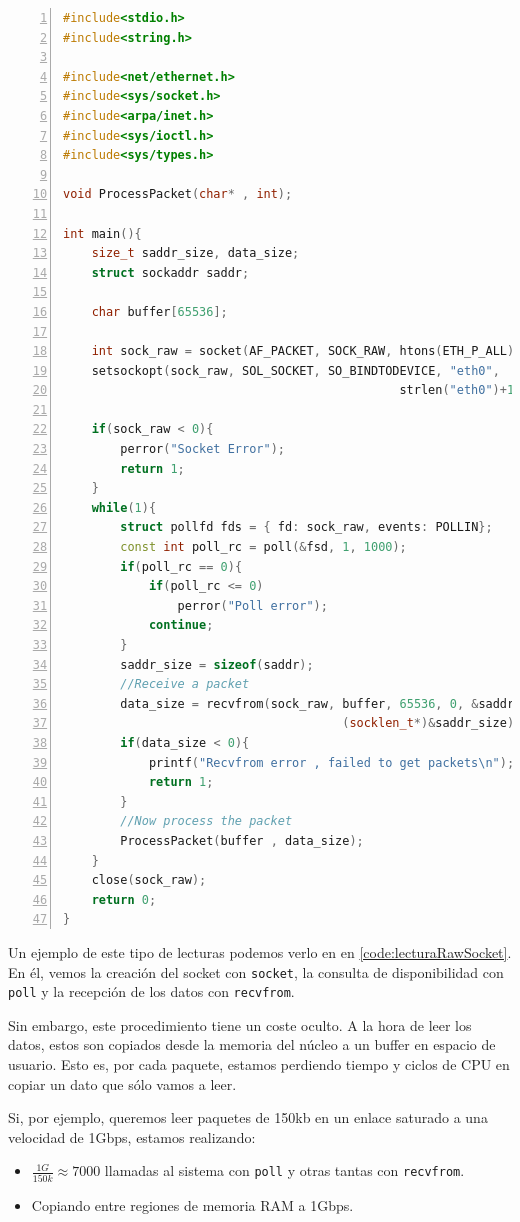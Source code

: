\begin{lstlisting}[language=C++,caption={Lectura desde un socket crudo}, 
breaklines=true, label=code:lecturaRawSocket,numbers=left,float=phtb]
#include<stdio.h>
#include<string.h>

#include<net/ethernet.h>
#include<sys/socket.h>
#include<arpa/inet.h>
#include<sys/ioctl.h>
#include<sys/types.h>
 
void ProcessPacket(char* , int);
 
int main(){
    size_t saddr_size, data_size;
    struct sockaddr saddr;
         
    char buffer[65536];
   
    int sock_raw = socket(AF_PACKET, SOCK_RAW, htons(ETH_P_ALL));
    setsockopt(sock_raw, SOL_SOCKET, SO_BINDTODEVICE, "eth0", 
                                               strlen("eth0")+1);
     
    if(sock_raw < 0){
        perror("Socket Error");
        return 1;
    }
    while(1){
        struct pollfd fds = { fd: sock_raw, events: POLLIN};
        const int poll_rc = poll(&fsd, 1, 1000);
        if(poll_rc == 0){
            if(poll_rc <= 0)
                perror("Poll error");
            continue;
        }
        saddr_size = sizeof(saddr);
        //Receive a packet
        data_size = recvfrom(sock_raw, buffer, 65536, 0, &saddr, 
                                       (socklen_t*)&saddr_size);
        if(data_size < 0){
            printf("Recvfrom error , failed to get packets\n");
            return 1;
        }
        //Now process the packet
        ProcessPacket(buffer , data_size);
    }
    close(sock_raw);
    return 0;
}
\end{lstlisting}

Un ejemplo de este tipo de lecturas podemos verlo en en \lstlistingname{} \ref{code:lecturaRawSocket}. En él, vemos la 
creación del socket con \texttt{socket}, la consulta de disponibilidad con \texttt{poll} y la recepción de los datos 
con \texttt{recvfrom}.

Sin embargo, este procedimiento tiene un coste oculto. A la hora de leer los datos, estos son copiados desde la 
memoria del núcleo a un buffer en espacio de usuario. Esto es, por cada paquete, estamos perdiendo tiempo y ciclos de 
CPU en copiar un dato que sólo vamos a leer.

Si, por ejemplo, queremos leer paquetes de 150kb en un enlace saturado a una velocidad de 1Gbps, estamos realizando:
\begin{itemize}
 \item $\frac{1G}{150k} \approx 7000$ llamadas al sistema con \texttt{poll} y otras tantas con \texttt{recvfrom}.
 \item Copiando entre regiones de memoria RAM a 1Gbps.
\end{itemize}

